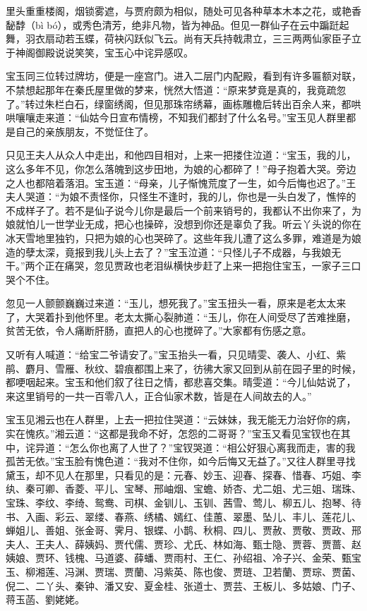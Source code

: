 \documentclass[12pt,oneside]{book}
\begin{document}
里头重重楼阁，烟锁雾遮，与贾府颇为相似，随处可见各种草本木本之花，或艳香馝馞（bì bó），或秀色清芳，绝非凡物，皆为神品。但见一群仙子在云中蹁跹起舞，羽衣扇动若玉蝶，荷袂闪跃似飞云。尚有天兵持戟肃立，三三两两仙家臣子立于神阁御殿说说笑笑，宝玉心中诧异感叹。


宝玉同三位转过牌坊，便是一座宫门。进入二层门内配殿，看到有许多匾额对联，不禁想起那年在秦氏屋里做的梦来，恍然大悟道：“原来梦竟是真的，我竟疏忽了。”转过朱栏白石，绿窗绣阁，但见那珠帘绣幕，画栋雕檐后转出百余人来，都哄哄嚷嚷走来道：“仙姑今日宣布情榜，不知我们都封了什么名号。”宝玉见人群里都是自己的亲族朋友，不觉怔住了。

只见王夫人从众人中走出，和他四目相对，上来一把搂住泣道：“宝玉，我的儿，这么多年不见，你怎么落魄到这步田地，为娘的心都碎了！”母子抱着大哭。旁边之人也都陪着落泪。宝玉道：“母亲，儿子惭愧荒度了一生，如今后悔也迟了。”王夫人哭道：“为娘不责怪你，只怪生不逢时，我的儿，你也是一头白发了，憔悴的不成样子了。若不是仙子说今儿你是最后一个前来销号的，我都认不出你来了，为娘就怕儿一世学业无成，把心也操碎，没想到你还是辜负了我。听云丫头说的你在冰天雪地里独钓，只把为娘的心也哭碎了。这些年我儿遭了这么多罪，难道是为娘造的孽太深，竟报到我儿头上去了？”宝玉泣道：“只怪儿子不成器，与我娘无干。”两个正在痛哭，忽见贾政也老泪纵横快步赶了上来一把抱住宝玉，一家子三口哭个不住。

忽见一人颤颤巍巍过来道：“玉儿，想死我了。”宝玉扭头一看，原来是老太太来了，大哭着扑到他怀里。老太太撕心裂肺道：“玉儿，你在人间受尽了苦难挫磨，贫苦无依，令人痛断肝肠，直把人的心也搅碎了。”大家都有伤感之意。

又听有人喊道：“给宝二爷请安了。”宝玉抬头一看，只见晴雯、袭人、小红、紫鹃、麝月、雪雁、秋纹、碧痕都围上来了，彷彿大家又回到从前在园子里的时候，都哽咽起来。宝玉和他们叙了往日之情，都悲喜交集。晴雯道：“今儿仙姑说了，来这里销号的一共一百零八人，正合仙家术数，皆是在人间故去的人。”

宝玉见湘云也在人群里，上去一把拉住哭道：“云妹妹，我无能无力治好你的病，实在愧疚。”湘云道：“这都是我命不好，怎怨的二哥哥？”宝玉又看见宝钗也在其中，诧异道：“怎么你也离了人世了？”宝钗哭道：“相公好狠心离我而走，害的我孤苦无依。”宝玉脸有愧色道：“我对不住你，如今后悔又无益了。”又往人群里寻找黛玉，却不见人在那里，只看见的是：元春、妙玉、迎春、探春、惜春、巧姐、李纨、秦可卿、香菱、平儿、宝琴、邢岫烟、宝蟾、娇杏、尤二姐、尤三姐、瑞珠、宝珠、李纹、李绮、鸳鸯、司棋、金钏儿、玉钏、茜雪、莺儿、柳五儿、抱琴、待书、入画、彩云、翠缕、春燕、绣橘、嫣红、佳蕙、翠墨、坠儿、丰儿、莲花儿、蝉姐儿、善姐、张金哥、霁月、银蝶、小鹊、秋桐、四儿、贾赦、贾敬、贾政、邢夫人、王夫人、薛姨妈、贾代儒、贾珍、尤氏、林如海、甄士隐、贾蓉、贾蔷、赵姨娘、贾环、钱槐、马道婆、薛蟠、贾雨村、王仁、孙绍祖、冷子兴、金荣、甄宝玉、柳湘莲、冯渊、贾瑞、贾蘭、冯紫英、陈也俊、贾琏、卫若蘭、贾琮、贾菌、倪二、二丫头、秦钟、潘又安、夏金桂、张道士、贾芸、王板儿、多姑娘、门子、蒋玉菡、劉姥姥。
\end{document}
